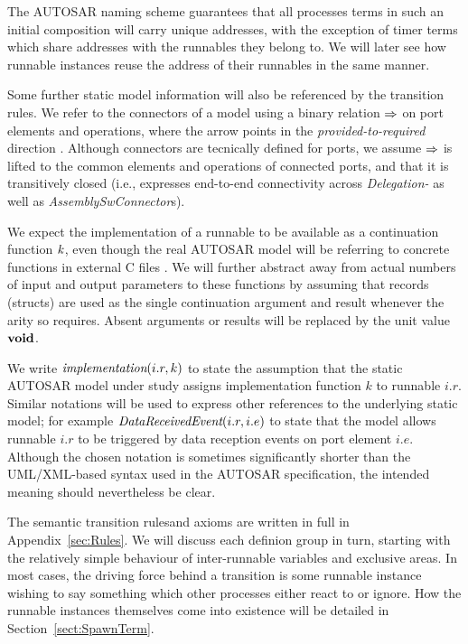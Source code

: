 \documentclass[10pt,conference]{IEEEtran}
\begin{document}
The AUTOSAR naming scheme \cite[ch.~3.2.5]{AR:SWC} guarantees that all processes terms in such an initial composition will carry unique addresses, with the exception of timer terms which share addresses with the runnables they belong to. We will later see how runnable instances reuse the address of their runnables in the same manner.

Some further static model information will also be referenced by the transition rules. We refer to the connectors of a model using a binary relation $ \Rightarrow $ on port elements and operations, where the arrow points in the \emph{provided-to-required} direction \cite[ch.~3.3.3]{AR:SWC}. Although connectors are tecnically defined for ports, we assume $ \Rightarrow $ is lifted to the common elements and operations of connected ports, and that it is transitively closed (i.e., expresses end-to-end connectivity across \emph{Delegation-} as well as \emph{AssemblySwConnector}s).

We expect the implementation of a runnable to be available as a continuation function $\Cont$, even though the real AUTOSAR model will be referring to concrete functions in external C files \cite[ch.~5.1.1]{AR:RTE}. We will further abstract away from actual numbers of input and output parameters to these functions by assuming that records (structs) are used as the single continuation argument and result whenever the arity so requires. Absent arguments or results will be replaced by the unit value $\textbf{void}$.

We write $\emph{implementation}(i.r,k)$ to state the assumption that the static AUTOSAR model under study assigns implementation function $k$ to runnable $i.r$. Similar notations will be used to express other references to the underlying static model; for example $\emph{DataReceivedEvent}(i.r,i.e)$ to state that the model allows runnable $i.r$ to be triggered by data reception events on port element $i.e$. Although the chosen notation is sometimes significantly shorter than the UML/XML-based syntax used in the AUTOSAR specification, the intended meaning should nevertheless be clear.

The semantic transition rulesand axioms  are written in full in Appendix~\ref{sec:Rules}. We will discuss each definion group in turn, starting with the relatively simple behaviour of inter-runnable variables and exclusive areas. In most cases, the driving force behind a transition is some runnable instance wishing to say something which other processes either react to or ignore. How the runnable instances themselves come into existence will be detailed in Section~\ref{sect:SpawnTerm}.
\end{document}
